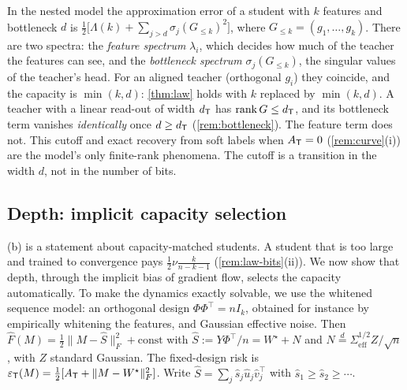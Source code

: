 \begin{remark}\label{rem:twospectra}
In the nested model the approximation error of a student with $k$ features and bottleneck $d$ is
$\frac12\big[\Lambda(k)+\sum_{j>d}\sigma_j(G_{\le k})^2\big]$, where $G_{\le k}=(g_1,\dots,g_k)$. There are two spectra: the
\emph{feature spectrum} $\lambda_i$, which decides how much of the teacher the features can see, and the
\emph{bottleneck spectrum} $\sigma_j(G_{\le k})$, the singular values of the teacher's head. For an aligned
teacher (orthogonal $g_i$) they coincide, and the capacity is $\min(k,d)$: \cref{thm:law} holds with $k$ replaced
by $\min(k,d)$. A teacher with a linear read-out of width $d_{\mathsf{T}}$ has $\operatorname{rank} G\le d_{\mathsf{T}}$, and its bottleneck term
vanishes \emph{identically} once $d\ge d_{\mathsf{T}}$ (\cref{rem:bottleneck}). The feature term does not. This cutoff and
exact recovery from soft labels when $A_{\mathsf{T}}=0$ (\cref{rem:curve}(i)) are the model's only finite-rank phenomena.
The cutoff is a transition in the width $d$, not in the number of bits.
\end{remark}

\subsection{Depth: implicit capacity selection}\label{sec:law-depth}

(b) is a statement about capacity-matched students. A student that is too large and
trained to convergence pays $\frac12\nu\frac k{n-k-1}$ (\cref{rem:law-bits}(ii)). We now show that depth, through the
implicit bias of gradient flow, selects the capacity automatically. To make the dynamics exactly solvable,
we use the whitened sequence model: an orthogonal design $\Phi\Phi^\top=nI_k$, obtained for instance by
empirically whitening the features, and Gaussian effective noise. Then
$\hat F(M)=\frac12\|M-\hat S\|_F^2+\mathrm{const}$ with $\hat S:=Y\Phi^\top/n=W^\star+N$ and
$N\overset d=\Sigma_{\mathrm{eff}}^{1/2}Z/\sqrt n$, with $Z$ standard Gaussian. The fixed-design risk is
$\varepsilon_{\mathsf{T}}(M)=\frac12[A_{\mathsf{T}}+\|M-W^\star\|_F^2]$. Write $\hat S=\sum_j\hat s_j\hat u_j\hat v_j^\top$ with $\hat s_1\ge\hat s_2\ge\cdots$.

